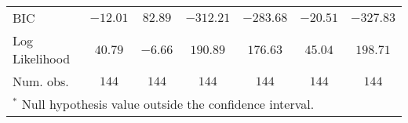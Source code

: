 \documentclass[
]{article}
\begin{document}
\begin{landscape}
\begin{table}
\begin{center}
\begin{tabular}{l c c c c c c}
BIC                    & $-12.01$                      & $82.89$                       & $-312.21$                     & $-283.68$                     & $-20.51$                      & $-327.83$                     \\
Log Likelihood         & $40.79$                       & $-6.66$                       & $190.89$                      & $176.63$                      & $45.04$                       & $198.71$                      \\
Num. obs.              & $144$                         & $144$                         & $144$                         & $144$                         & $144$                         & $144$                         \\
\hline
\multicolumn{7}{l}{\scriptsize{$^*$ Null hypothesis value outside the confidence interval.}}
\end{tabular}
\label{table:coefficients}
\end{center}
\end{table}
\end{landscape}
\end{document}
